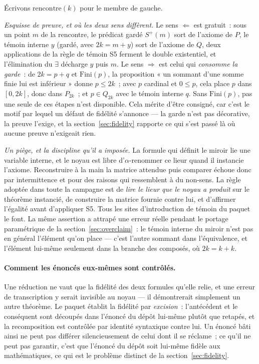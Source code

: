 \documentclass[11pt]{article}
\theoremstyle{remark}\newtheorem{remarque}{Remarque}
\begin{document}
Écrivons $\mathrm{rencontre}(k)$ pour le membre de gauche.

\emph{Esquisse de preuve, et où les deux sens diffèrent.} Le sens $\Leftarrow$ est
gratuit~: sous un point $m$ de la rencontre, le prédicat gardé $S^{+}(m)$ sort de
l'axiome de $P$, le témoin interne $y$ (gardé, avec $2k = m + y$) sort de l'axiome de
$Q$, deux applications de la règle de témoin S5 ferment le double existentiel, et
l'élimination du $\exists$ décharge $y$ puis $m$. Le sens $\Rightarrow$ est celui qui
\emph{consomme la garde}~: de $2k = p + q$ et $\mathrm{Fini}(p)$, la proposition « un
sommant d'une somme finie lui est inférieur » donne $p \le 2k$~; avec $p$ cardinal et
$0 \le p$, cela place $p$ dans $[0, 2k]$, donc dans $P_{2k}$~; et $p \in Q_{2k}$ avec le
témoin interne $q$. Sans $\mathrm{Fini}(p)$, pas une seule de ces étapes n'est
disponible. Cela mérite d'être consigné, car c'est le motif par lequel un défaut de
fidélité s'annonce --- la garde n'est pas décorative, la preuve l'exige, et la
section~\ref{sec:fidelity} rapporte ce qui s'est passé là où aucune preuve n'exigeait
rien.

\emph{Un piège, et la discipline qu'il a imposée.} La formule qui définit le miroir lie
une variable interne, et le noyau est libre d'$\alpha$-renommer ce lieur quand il
instancie l'axiome. Reconstruire à la main la matrice attendue puis comparer échoue donc
par intermittence et pour des raisons qui ressemblent à du non-sens. La règle adoptée dans
toute la campagne est de \emph{lire le lieur que le noyau a produit} sur le théorème
instancié, de construire la matrice fournie contre lui, et d'affirmer l'égalité avant
d'appliquer S5. Tous les sites d'introduction de témoin du paquet le font. La même
assertion a attrapé une erreur réelle pendant le portage paramétrique de la
section~\ref{sec:overclaim}~: le témoin interne du miroir n'est pas en général l'élément
qu'on place --- c'est l'autre sommant dans l'équivalence, et l'élément lui-même seulement
dans la branche des composés, où $2k = k + k$.

\paragraph{Comment les énoncés eux-mêmes sont contrôlés.} Une réduction ne vaut que la
fidélité des deux formules qu'elle relie, et une erreur de transcription y serait
invisible au noyau --- il démontrerait simplement un autre théorème. Le paquet établit la
fidélité par \emph{excision}~: l'antécédent et le conséquent sont découpés dans l'énoncé
du dépôt lui-même plutôt que retapés, et la recomposition est contrôlée par identité
syntaxique contre lui. Un énoncé bâti ainsi ne peut pas différer silencieusement de celui
dont il se réclame~; ce qu'il ne peut pas garantir, c'est que l'énoncé du dépôt soit
lui-même fidèle aux mathématiques, ce qui est le problème distinct de la
section~\ref{sec:fidelity}.
\end{document}
